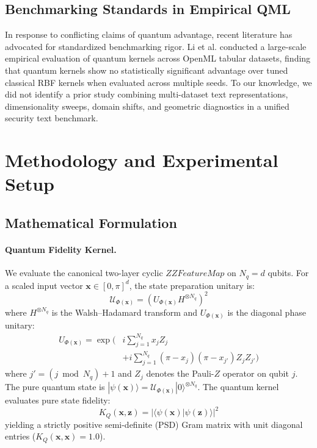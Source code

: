 \documentclass[10pt,twocolumn,letterpaper]{article}
\begin{document}
\subsection{Benchmarking Standards in Empirical QML}
In response to conflicting claims of quantum advantage, recent literature has advocated for standardized benchmarking rigor. Li et al. \cite{li2026large} conducted a large-scale empirical evaluation of quantum kernels across OpenML tabular datasets, finding that quantum kernels show no statistically significant advantage over tuned classical RBF kernels when evaluated across multiple seeds. To our knowledge, we did not identify a prior study combining multi-dataset text representations, dimensionality sweeps, domain shifts, and geometric diagnostics in a unified security text benchmark.

\section{Methodology and Experimental Setup}
\label{sec:method}

\subsection{Mathematical Formulation}

\paragraph{Quantum Fidelity Kernel.} We evaluate the canonical two-layer cyclic $ZZFeatureMap$ on $N_q = d$ qubits. For a scaled input vector $\mathbf{x} \in [0, \pi]^d$, the state preparation unitary is:
\begin{equation}
\mathcal{U}_{\Phi(\mathbf{x})} = \left( U_{\Phi(\mathbf{x})} H^{\otimes N_q} \right)^2
\end{equation}
where $H^{\otimes N_q}$ is the Walsh--Hadamard transform and $U_{\Phi(\mathbf{x})}$ is the diagonal phase unitary:
\begin{align}
U_{\Phi(\mathbf{x})} = \exp\Biggl( & i \sum_{j=1}^{N_q} x_j Z_j \nonumber \\
& + i \sum_{j=1}^{N_q} (\pi - x_j)(\pi - x_{j'}) Z_j Z_{j'} \Biggr)
\end{align}
where $j' = (j \bmod N_q) + 1$ and $Z_j$ denotes the Pauli-$Z$ operator on qubit $j$. The pure quantum state is $|\psi(\mathbf{x})\rangle = \mathcal{U}_{\Phi(\mathbf{x})} |0\rangle^{\otimes N_q}$. The quantum kernel evaluates pure state fidelity:
\begin{equation}
K_Q(\mathbf{x}, \mathbf{z}) = |\langle \psi(\mathbf{x}) | \psi(\mathbf{z}) \rangle|^2
\end{equation}
yielding a strictly positive semi-definite (PSD) Gram matrix with unit diagonal entries ($K_Q(\mathbf{x}, \mathbf{x}) = 1.0$).
\end{document}
